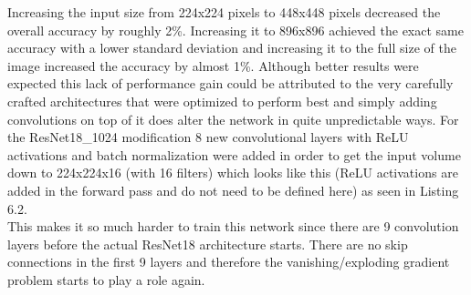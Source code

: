 \begin{table}[!h] \centering
{}
\caption{Different image input sizes are fed into ResNet18 architectures with only 16 filters per layer. The first layers of the network have been adapted to allow bigger input images}
\label{tbl:resnet18-different-input}
\end{table}

Increasing the input size from 224x224 pixels to 448x448 pixels decreased the overall accuracy by roughly 2\%. Increasing it to 896x896 achieved the exact same accuracy with a lower standard deviation and increasing it to the full size of the image increased the accuracy by almost 1\%. Although better results were expected this lack of  performance  gain could be attributed to the very carefully crafted architectures that were optimized to perform best and simply adding convolutions on top of it does alter the network in quite unpredictable ways. For the ResNet18\_1024 modification 8 new convolutional layers with ReLU activations and batch normalization were added in order to get the input volume down to 224x224x16 (with 16 filters) which looks like this (ReLU activations are added in the forward pass and do not need to be defined here) as seen in Listing 6.2. \\


This makes it so much harder to train this network since there are 9 convolution layers before the actual ResNet18 architecture starts. There are no skip connections in the first 9 layers and therefore the vanishing/exploding gradient problem starts to play a role again.

\newpage

